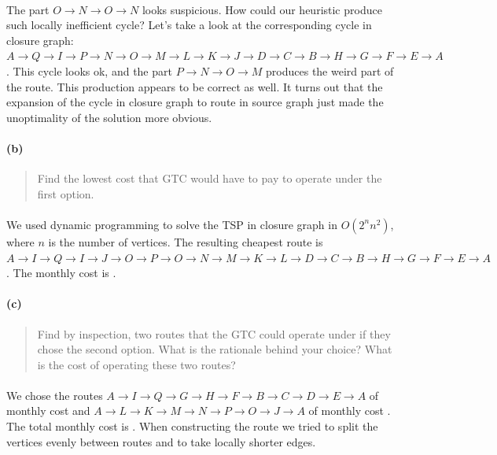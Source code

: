 \paragraph{}
The part $ O \rightarrow N \rightarrow O \rightarrow N $ looks suspicious. How could our heuristic produce such locally inefficient cycle? Let's take a look at the corresponding cycle in closure graph: $ A \rightarrow Q \rightarrow I \rightarrow P \rightarrow N \rightarrow O \rightarrow M \rightarrow L \rightarrow K \rightarrow J \rightarrow D \rightarrow C \rightarrow B \rightarrow H \rightarrow G \rightarrow F \rightarrow E \rightarrow A $. This cycle looks ok, and the part $ P \rightarrow N \rightarrow O \rightarrow M $ produces the weird part of the route. This production appears to be correct as well. It turns out that the expansion of the cycle in closure graph to route in source graph just made the unoptimality of the solution more obvious.

\paragraph{(b)}
\begin{quote}
Find the lowest cost that GTC would have to pay to operate under the first option.
\end{quote}

\paragraph{}
We used dynamic programming to solve the TSP in closure graph in $O(2^n n^2)$, where $n$ is the number of vertices. The resulting cheapest route is $ A \rightarrow I \rightarrow Q \rightarrow I \rightarrow J \rightarrow O \rightarrow P \rightarrow O \rightarrow N \rightarrow M \rightarrow K \rightarrow L \rightarrow D \rightarrow C \rightarrow B \rightarrow H \rightarrow G \rightarrow F \rightarrow E \rightarrow A $. The monthly cost is .

\paragraph{(c)}
\begin{quote}
Find by inspection, two routes that the GTC could operate under if they chose the second option. What is the rationale behind your choice? What is the cost of
operating these two routes?
\end{quote}

\paragraph{}
We chose the routes $ A \rightarrow I \rightarrow Q \rightarrow G \rightarrow H \rightarrow F \rightarrow B \rightarrow C \rightarrow D \rightarrow E \rightarrow A $ of monthly cost  and $ A \rightarrow L \rightarrow K \rightarrow M \rightarrow N \rightarrow P \rightarrow O \rightarrow J \rightarrow A $ of monthly cost . The total monthly cost is . When constructing the route we tried to split the vertices evenly between routes and to take locally shorter edges.

